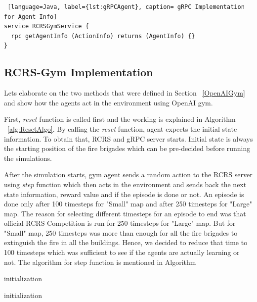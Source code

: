 \documentclass[12pt]{report}
\begin{document}
\begin{lstlisting} [language=Java, label={lst:gRPCAgent}, caption= gRPC Implementation for Agent Info] 
service RCRSGymService {
  rpc getAgentInfo (ActionInfo) returns (AgentInfo) {}
}
\end{lstlisting}

\subsection{RCRS-Gym Implementation} \label{RCRSGymImplementation}

Lets elaborate on the two methods that were defined in Section ~\ref{OpenAIGym} and show how the agents act in the environment using OpenAI gym. 

First, \emph{reset} function is called first and the working is explained in Algorithm ~\ref{alg:ResetAlgo}. By calling the \emph{reset} function, agent expects the initial state information. To obtain that, RCRS and gRPC server starts. Initial state is always the starting position of the fire brigades which can be pre-decided before running the simulations.

After the simulation starts, gym agent sends a random action to the RCRS server using \emph{step} function which then acts in the environment and sends back the next state information, reward value and if the episode is done or not. An episode is done only after 100 timesteps for "Small" map and after 250 timesteps for "Large" map. The reason for selecting different timesteps for an episode to end was that official RCRS Competition is run for 250 timesteps for "Large" map. But for "Small" map, 250 timesteps was more than enough for all the fire brigades to extinguish the fire in all the buildings. Hence, we decided to reduce that time to 100 timesteps which was sufficient to see if the agents are actually learning or not. The algorithm for step function is mentioned in Algorithm 

\begin{algorithm}[H]
\SetAlgoLined
{}
 initialization\;
 \caption{\emph{Reset} implementation}
 \label{alg:ResetAlgo}
\end{algorithm}

\begin{algorithm}[H]
\SetAlgoLined
{}
 initialization\;
 \caption{\emph{Step} implementation}
 \label{alg:StepAlgo}
\end{algorithm}
\end{document}
